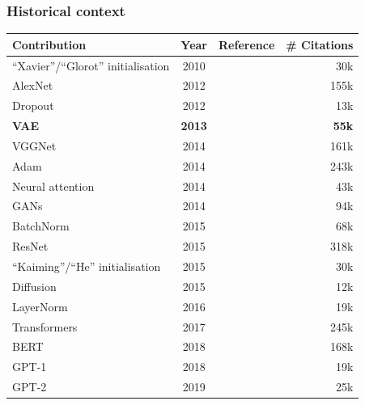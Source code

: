 \documentclass[xcolor=table,dvipsnames]{beamer}
\begin{document}
\begin{frame}[shrink=20]
    \frametitle{Historical context}
    \begin{center}
        \begin{tabular}{l c l r}
            \hline
            \textbf{Contribution} & \textbf{Year} & \textbf{Reference} & \textbf{\# Citations} \\
            \hline
            ``Xavier''/``Glorot'' initialisation & 2010 & \cite{glorot2010understanding} & 30k \\
            AlexNet & 2012 & \cite{krizhevsky2012imagenet} & 155k \\
            Dropout & 2012 & \cite{hinton2012improving} & 13k \\
            \hline
            \hline
            \textbf{VAE} & \textbf{2013} & \textbf{\cite{kingma2013auto}} & \textbf{55k} \\
            \hline
            \hline
            VGGNet & 2014 & \cite{simonyan2014very} & 161k \\
            Adam & 2014 & \cite{kingma2014adam} & 243k \\
            Neural attention & 2014 & \cite{bahdanau2014neural} & 43k \\
            GANs & 2014 & \cite{goodfellow2014generative} & 94k \\
            BatchNorm & 2015 & \cite{ioffe2015batch} & 68k \\
            ResNet & 2015 & \cite{he2016deep} & 318k \\
            ``Kaiming''/``He'' initialisation & 2015 & \cite{he2015delving} & 30k \\
            Diffusion & 2015 & \cite{sohl2015deep} & 12k \\
            LayerNorm & 2016 & \cite{ba2016layer} & 19k \\
            Transformers & 2017 & \cite{vaswani2017attention} & 245k \\
            BERT & 2018 & \cite{devlin2019bert} & 168k \\
            GPT-1 & 2018 & \cite{radford2018improving} & 19k \\
            GPT-2 & 2019 & \cite{radford2019language} & 25k \\
            \hline
        \end{tabular}
    \end{center}
\end{frame}
\end{document}

